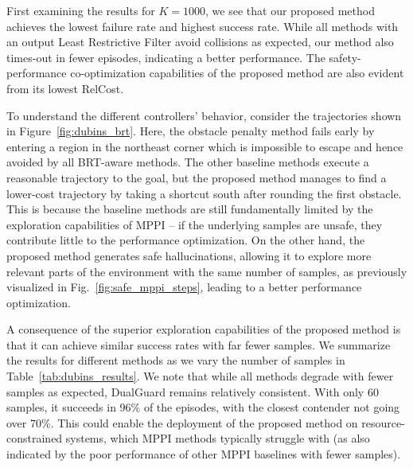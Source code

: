 First examining the results for $K=1000$, we see that our proposed method achieves the lowest failure rate and highest success rate. While all methods with an output Least Restrictive Filter avoid collisions as expected, our method also times-out in fewer episodes, indicating a better performance. The safety-performance co-optimization capabilities of the proposed method are also evident from its lowest RelCost.

To understand the different controllers' behavior, consider the trajectories shown in Figure~\ref{fig:dubins_brt}. Here, the obstacle penalty method fails early by entering a region in the northeast corner which is impossible to escape and hence avoided by all BRT-aware methods. The other baseline methods execute a reasonable trajectory to the goal, but the proposed method manages to find a lower-cost trajectory by taking a shortcut south after rounding the first obstacle. This is because the baseline methods are still fundamentally limited by the exploration capabilities of MPPI -- if the underlying samples are unsafe, they contribute little to the performance optimization. On the other hand, the proposed method generates safe hallucinations, allowing it to explore more relevant parts of the environment with the same number of samples, as previously visualized in Fig.~\ref{fig:safe_mppi_steps}, leading to a better performance optimization.

A consequence of the superior exploration capabilities of the proposed method is that it can achieve similar success rates with far fewer samples. We summarize the results for different methods as we vary the number of samples in Table~\ref{tab:dubins_results}. We note that while all methods degrade with fewer samples as expected, DualGuard remains relatively consistent. With only 60 samples, it succeeds in 96\% of the episodes, with the closest contender not going over 70\%.
This could enable the deployment of the proposed method on resource-constrained systems, which MPPI methods typically struggle with (as also indicated by the poor performance of other MPPI baselines with fewer samples).


